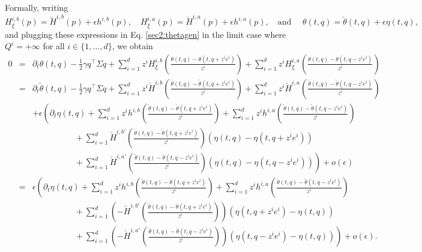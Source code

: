 \documentclass[preprint, 3p]{elsarticle}
\newcommand{\1}{{\chi}}
\begin{document}
Formally, writing
$$H_\xi^{i,b}(p) = \check{H}^{i,b}(p) + \epsilon h^{i,b}(p), \quad
  H_\xi^{i,a}(p) = \check{H}^{i,a}(p) + \epsilon h^{i,a}(p), \quad
  \text{and } \quad \theta(t,q) = \check{\theta}(t,q) + \epsilon \eta(t,q),$$
and plugging these expressions in Eq. \eqref{sec2:thetagen} in the limit case where $Q^i = +\infty$ for all $i \in \{1, \ldots, d\}$, we obtain
\begingroup
\allowdisplaybreaks
\begin{eqnarray*}
0 &=& \partial_t \theta(t,q) - \frac 12 \gamma q^\intercal \Sigma q + \sum_{i=1}^d z^i H^{i,b}_\xi \left( \frac{\theta(t,q) - \theta(t,q+z^ie^i)}{z^i} \right) + \sum_{i=1}^d z^i H^{i,a}_\xi \left( \frac{\theta(t,q) - \theta(t,q-z^ie^i)}{z^i} \right)\\
    &=& \partial_t \check{\theta}(t,q) - \frac 12 \gamma q^\intercal \Sigma q + \sum_{i=1}^d z^i \check{H}^{i,b} \left( \frac{\check{\theta}(t,q) - \check{\theta}(t,q+z^ie^i)}{z^i} \right) + \sum_{i=1}^d z^i \check{H}^{i,a} \left( \frac{\check{\theta}(t,q) - \check{\theta}(t,q-z^ie^i)}{z^i} \right)\\
    &&+ \epsilon \left(\partial_t \eta(t,q) + \sum_{i=1}^d z^i h^{i,b} \left( \frac{\check{\theta}(t,q) - \check{\theta}(t,q+z^ie^i)}{z^i} \right) + \sum_{i=1}^d z^i h^{i,a} \left( \frac{\check{\theta}(t,q) - \check{\theta}(t,q-z^ie^i)}{z^i} \right)\right.\\
    && \qquad \qquad\quad+ \sum_{i=1}^d \check{H}^{i,b\prime} \left( \frac{\check{\theta}(t,q) - \check{\theta}(t,q+z^ie^i)}{z^i} \right) \left(\eta(t,q) - \eta(t,q+z^ie^i)\right)\\
    &&\left.\qquad\qquad\quad+ \sum_{i=1}^d \check{H}^{i,a\prime} \left( \frac{\check{\theta}(t,q) - \check{\theta}(t,q-z^ie^i)}{z^i} \right)\left(\eta(t,q) - \eta(t,q-z^ie^i)\right)\right) + o(\epsilon)\\
    &=& \epsilon \left(\partial_t \eta(t,q) + \sum_{i=1}^d z^i h^{i,b} \left( \frac{\check{\theta}(t,q) - \check{\theta}(t,q+z^ie^i)}{z^i} \right) + \sum_{i=1}^d z^i h^{i,a} \left( \frac{\check{\theta}(t,q) - \check{\theta}(t,q-z^ie^i)}{z^i} \right)\right.\\
    &&\qquad\qquad\quad+ \sum_{i=1}^d \left(-\check{H}^{i,b\prime} \left( \frac{\check{\theta}(t,q) - \check{\theta}(t,q+z^ie^i)}{z^i} \right)\right) \left(\eta(t,q+z^ie^i) - \eta(t,q)\right)\\
    &&\left.\qquad\qquad\quad+ \sum_{i=1}^d \left(-\check{H}^{i,a\prime} \left( \frac{\check{\theta}(t,q) - \check{\theta}(t,q-z^ie^i)}{z^i} \right)\right)\left(\eta(t,q-z^ie^i) - \eta(t,q)\right)\right) + o(\epsilon).
\end{eqnarray*}
\endgroup
\end{document}
